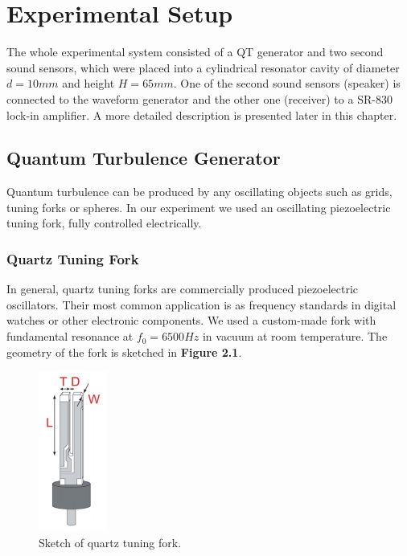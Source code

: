 \chapter{Experimental Setup}

The whole experimental system consisted of a QT generator and two second sound sensors, which were placed into a cylindrical resonator cavity of diameter $ d=10\unit{mm}$ and height $ H=65\unit{mm} $. One of the second sound sensors (speaker) is connected to the waveform generator and the other one (receiver) to a SR-830 lock-in amplifier. A more detailed description is presented later in this chapter.


\section{Quantum Turbulence Generator}

Quantum turbulence can be produced by any oscillating objects such as grids, tuning forks or spheres. In our experiment we used an oscillating piezoelectric tuning fork, fully controlled electrically.

\subsection*{Quartz Tuning Fork}

In general, quartz tuning forks are commercially produced piezoelectric oscillators. Their most common application is as frequency standards in digital watches or other electronic components.
We used a custom-made fork with fundamental resonance at $ f_0 = 6500\unit{Hz} $ in vacuum at room temperature. The geometry of the fork is sketched in {\sffamily\textbf{Figure 2.1}}.

\begin{figure}
	\centering
	\vspace{-0.8cm}
	\includegraphics[width=0.20\textwidth]{graphics/quartz}
	\caption{Sketch of quartz tuning fork.}
	\vspace{-1.8cm}
\end{figure}

